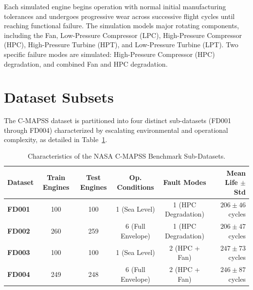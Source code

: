 \documentclass[12pt,a4paper,oneside]{report}
\begin{document}
Each simulated engine begins operation with normal initial manufacturing tolerances and undergoes progressive wear across successive flight cycles until reaching functional failure. The simulation models major rotating components, including the Fan, Low-Pressure Compressor (LPC), High-Pressure Compressor (HPC), High-Pressure Turbine (HPT), and Low-Pressure Turbine (LPT). Two specific failure modes are simulated: High-Pressure Compressor (HPC) degradation, and combined Fan and HPC degradation.

\section{Dataset Subsets}
The C-MAPSS dataset is partitioned into four distinct sub-datasets (FD001 through FD004) characterized by escalating environmental and operational complexity, as detailed in Table~\ref{tab:cmapss_subsets}.

\begin{table}[htbp]
    \centering
    \caption{Characteristics of the NASA C-MAPSS Benchmark Sub-Datasets.}
    \label{tab:cmapss_subsets}
    \begin{tabular}{lccccr}
        \toprule
        \textbf{Dataset} & \textbf{Train Engines} & \textbf{Test Engines} & \textbf{Op. Conditions} & \textbf{Fault Modes} & \textbf{Mean Life $\pm$ Std} \\
        \midrule
        \textbf{FD001} & 100 & 100 & 1 (Sea Level) & 1 (HPC Degradation) & $206 \pm 46$ cycles \\
        \textbf{FD002} & 260 & 259 & 6 (Full Envelope) & 1 (HPC Degradation) & $206 \pm 47$ cycles \\
        \textbf{FD003} & 100 & 100 & 1 (Sea Level) & 2 (HPC + Fan) & $247 \pm 73$ cycles \\
        \textbf{FD004} & 249 & 248 & 6 (Full Envelope) & 2 (HPC + Fan) & $246 \pm 87$ cycles \\
        \bottomrule
    \end{tabular}
\end{table}
\end{document}
